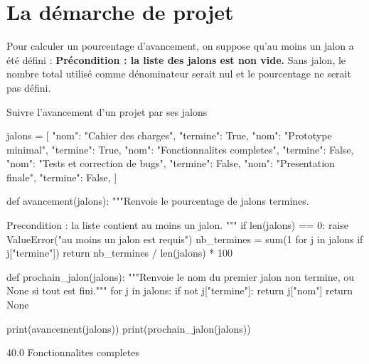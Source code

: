 \section{La démarche de projet}




Pour calculer un pourcentage d'avancement, on suppose qu'au moins un jalon a été défini :
\textbf{Précondition : la liste des jalons est non vide.} Sans jalon, le nombre total utilisé
comme dénominateur serait nul et le pourcentage ne serait pas défini.

\begin{codereference}{Suivre l'avancement d'un projet par ses jalons}
\begin{python}
jalons = [
    {"nom": "Cahier des charges", "termine": True},
    {"nom": "Prototype minimal", "termine": True},
    {"nom": "Fonctionnalites completes", "termine": False},
    {"nom": "Tests et correction de bugs", "termine": False},
    {"nom": "Presentation finale", "termine": False},
]


def avancement(jalons):
    """Renvoie le pourcentage de jalons termines.

    Precondition : la liste contient au moins un jalon.
    """
    if len(jalons) == 0:
        raise ValueError("au moins un jalon est requis")
    nb_termines = sum(1 for j in jalons if j["termine"])
    return nb_termines / len(jalons) * 100


def prochain_jalon(jalons):
    """Renvoie le nom du premier jalon non termine, ou None si tout est fini."""
    for j in jalons:
        if not j["termine"]:
            return j["nom"]
    return None


print(avancement(jalons))
print(prochain_jalon(jalons))
\end{python}

\begin{console}
40.0
Fonctionnalites completes
\end{console}
\end{codereference}

